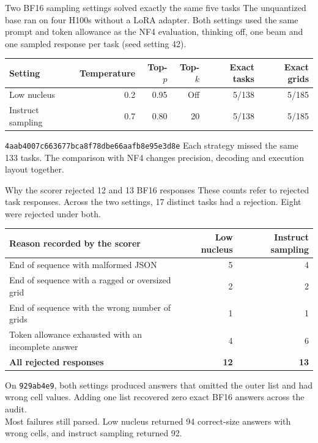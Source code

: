 \documentclass[aspectratio=169,11pt]{beamer}
\newcommand{\normbody}{\fontsize{16}{20}\selectfont}
\newcommand{\med}{\fontsize{14}{17}\selectfont}
\newcommand{\id}[1]{\texttt{#1}}
\newcommand{\sectiontag}{A\quad NF4 greedy decoding}
\newcommand{\readsource}{Archived responses}
\newcommand{\readurl}{https://github.com/anatol21/arc-agi-3/blob/e37ec8b840155c28c843b175cf1f2116d5c5d8cc/benchmarks/qwen3.8-flash-next/greedy-no-thinking/held-out-138/evidence/observations.jsonl}
\newcommand{\bfurl}{https://github.com/anatol21/arc-agi-3/blob/e37ec8b840155c28c843b175cf1f2116d5c5d8cc/benchmarks/qwen3.8-flash-next/bf16-sampling/responses.jsonl}
\begin{document}
\renewcommand{\sectiontag}{B\quad BF16 sampled decoding}
\renewcommand{\readurl}{\bfurl}
\renewcommand{\readsource}{BF16 response archive}
\begin{frame}[t]{Two BF16 sampling settings solved exactly the same five tasks}
\normbody
The unquantized base ran on four H100s without a LoRA adapter. Both settings used the same prompt and token allowance as the NF4 evaluation, thinking off, one beam and one sampled response per task (seed setting 42).
\vspace{5mm}
\begin{center}
\med\begin{tabular}{@{}lrrrrr@{}}
\toprule
Setting & Temperature & Top-$p$ & Top-$k$ & Exact tasks & Exact grids\\
\midrule
Low nucleus & 0.2 & 0.95 & Off & 5/138 & 5/185\\
Instruct sampling & 0.7 & 0.80 & 20 & 5/138 & 5/185\\
\bottomrule
\end{tabular}
\end{center}
\vspace{3mm}
\normbody
\id{4aab4007}\quad \id{c663677b}\quad \id{ca8f78db}\quad \id{e66aafb8}\quad \id{e95e3d8e}
\vfill
\med Each strategy missed the same 133 tasks. The comparison with NF4 changes precision, decoding and execution layout together.
\end{frame}

\begin{frame}[t]{Why the scorer rejected 12 and 13 BF16 responses}
\normbody
These counts refer to rejected task responses. Across the two settings, 17 distinct tasks had a rejection. Eight were rejected under both.
\vspace{3mm}
\begin{center}
\med\begin{tabular}{@{}lrr@{}}
\toprule
Reason recorded by the scorer & Low nucleus & Instruct sampling\\
\midrule
End of sequence with malformed JSON & 5 & 4\\
End of sequence with a ragged or oversized grid & 2 & 2\\
End of sequence with the wrong number of grids & 1 & 1\\
Token allowance exhausted with an incomplete answer & 4 & 6\\
\midrule
\textbf{All rejected responses} & \textbf{12} & \textbf{13}\\
\bottomrule
\end{tabular}
\end{center}
\vfill
\med On \id{929ab4e9}, both settings produced answers that omitted the outer list and had wrong cell values. Adding one list recovered zero exact BF16 answers across the audit.\\[1.5mm] Most failures still parsed. Low nucleus returned 94 correct-size answers with wrong cells, and instruct sampling returned 92.
\end{frame}
\end{document}
